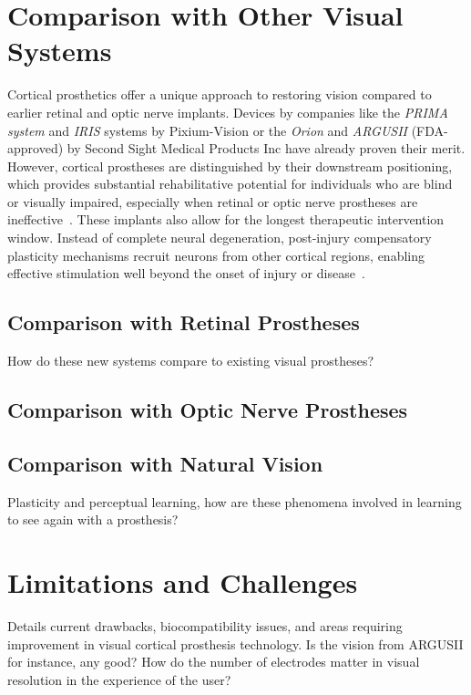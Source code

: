 \documentclass[twocolumn,10pt]{article}
\begin{document}
\section*{Comparison with Other Visual Systems}\label{sec:comparison}
Cortical prosthetics offer a unique approach to restoring vision compared to
earlier retinal and optic nerve implants. Devices by companies like the
\textit{PRIMA system} and \textit{IRIS} systems by Pixium-Vision or the
\textit{Orion} and \textit{ARGUSII} (FDA-approved) by Second Sight Medical
Products Inc have already proven their merit. However, cortical prostheses are
distinguished by their downstream positioning, which provides substantial
rehabilitative potential for individuals who are blind or visually impaired,
especially when retinal or optic nerve prostheses are
ineffective~\parencite{tzekovGabelEdArtificial2020}. These implants also allow
for the longest therapeutic intervention window. Instead of complete neural
degeneration, post-injury compensatory plasticity mechanisms recruit neurons
from other cortical regions, enabling effective stimulation well beyond the
onset of injury or disease~\parencite{beyelerLearningSeeAgain2017}.

\subsection*{Comparison with Retinal Prostheses}
How do these new systems compare to existing visual prostheses?

\subsection*{Comparison with Optic Nerve Prostheses}

\subsection*{Comparison with Natural Vision}
Plasticity and perceptual learning, how are these phenomena involved in learning
to see again with a prosthesis?

\section*{Limitations and Challenges}\label{sec:limitations}
Details current drawbacks, biocompatibility issues, and areas requiring
improvement in visual cortical prosthesis technology. Is the vision from ARGUSII
for instance, any good? How do the number of electrodes matter in visual
resolution in the experience of the user?
\end{document}

